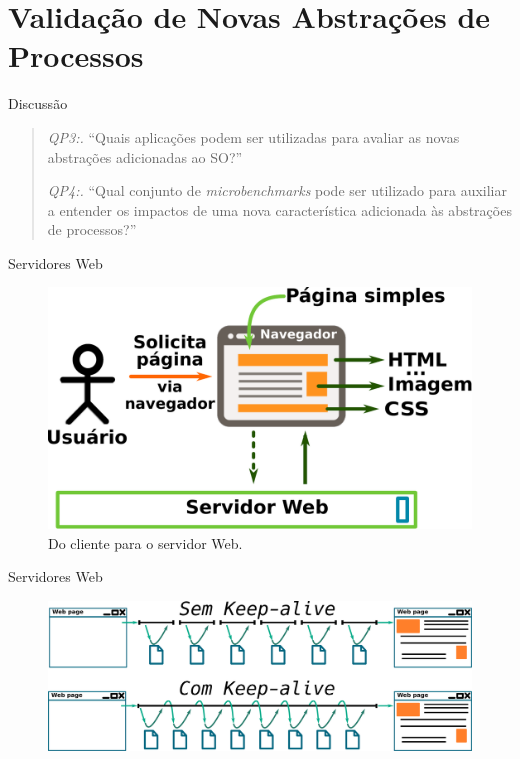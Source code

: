 \documentclass[xcolor={usenames,svgnames,dvipsnames},brazil,english,12pt,aspectratio=149]{beamer}
\begin{document}
\section{Validação de Novas Abstrações de Processos}

\begin{frame}{Discussão}
  \begin{quote}
    \item \emph{QP3:.} ``Quais aplicações podem ser utilizadas para avaliar as novas abstrações adicionadas ao SO?''
    \item \emph{QP4:.} ``Qual conjunto de \emph{microbenchmarks} pode ser utilizado para auxiliar a entender os impactos de uma nova característica adicionada às abstrações de processos?''
  \end{quote}
\end{frame}

\begin{frame}{Servidores Web}
  \begin{figure}[!h]
    \centering
    \includegraphics[width=.8\textwidth]{request_a_page}
    \caption*{Do cliente para o servidor Web.}
  \end{figure}
\end{frame}

\begin{frame}{Servidores Web}
  \begin{figure}[!h]
    \centering
    \includegraphics[width=\textwidth]{with_without_keep_alive}
  \end{figure}
\end{frame}
\end{document}
